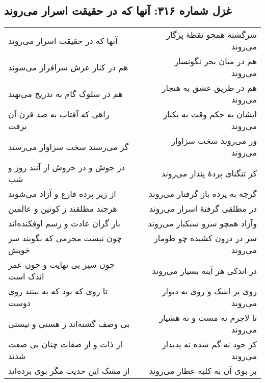\begin{center}
\section*{غزل شماره ۳۱۶: آنها که در حقیقت اسرار می‌روند}
\label{sec:316}
\begin{longtable}{l p{0.5cm} r}
آنها که در حقیقت اسرار می‌روند
&&
سرگشته همچو نقطهٔ پرگار می‌روند
\\
هم در کنار عرش سرافراز می‌شوند
&&
هم در میان بحر نگونسار می‌روند
\\
هم در سلوک گام به تدریج می‌نهند
&&
هم در طریق عشق به هنجار می‌روند
\\
راهی که آفتاب به صد قرن آن برفت
&&
ایشان به حکم وقت به یکبار می‌روند
\\
گر می‌رسند سخت سزاوار می‌رسند
&&
ور می‌روند سخت سزاوار می‌روند
\\
در جوش و در خروش از آنند روز و شب
&&
کز تنگنای پردهٔ پندار می‌روند
\\
از زیر پرده فارغ و آزاد می‌شوند
&&
گرچه به پرده باز گرفتار می‌روند
\\
هرچند مطلقند ز کونین و عالمین
&&
در مطلقی گرفتهٔ اسرار می‌روند
\\
بار گران عادت و رسم اوفکنده‌اند
&&
وآزاد همچو سرو سبکبار می‌روند
\\
چون نیست محرمی که بگویند سر خویش
&&
سر در درون کشیده چو طومار می‌روند
\\
چون سیر بی نهایت و چون عمر اندک است
&&
در اندکی هر آینه بسیار می‌روند
\\
تا روی که بود که به بینند روی دوست
&&
روی پر اشک و روی به دیوار می‌روند
\\
بی وصف گشته‌اند ز هستی و نیستی
&&
تا لاجرم نه مست و نه هشیار می‌روند
\\
از ذات و از صفات چنان بی صفت شدند
&&
کز خود نه گم شده نه پدیدار می‌روند
\\
از مشک این حدیث مگر بوی برده‌اند
&&
بر بوی آن به کلبه عطار می‌روند
\\
\end{longtable}
\end{center}
